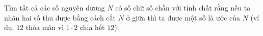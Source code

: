 \ifshowproblem
\begin{problem}\label{example:ROU-2015-JBMO-TST-D2-P1}
    Tìm tất cả các số nguyên dương \( N \) có số chữ số chẵn với tính chất rằng nếu ta nhân hai số thu được bằng cách cắt \( N \) ở giữa
    thì ta được một số là ước của \( N \) (ví dụ, \(12\) thỏa mãn vì \(1 \cdot 2\) chia hết \(12\)).
\end{problem}
\fi

\footnotemark
{}
\fi